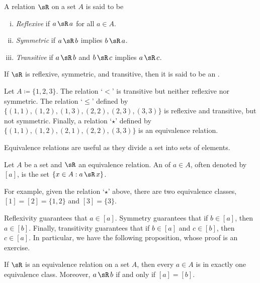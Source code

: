 \begin{defn}
\pagebreak[2]
A relation
$\sR$ on a set $A$ is said to be
\begin{enumerate}[(i)]
\item
\emph{Reflexive} if $a\, \sR \, a$ for
all $a \in A$.
\item
\emph{Symmetric} if $a\, \sR \, b$ implies
$b \, \sR \, a$.
\item
\emph{Transitive} if $a\, \sR \, b$ and
$b \, \sR \, c$ implies $a\, \sR \, c$.
\end{enumerate}
If $\sR$ is reflexive, symmetric, and transitive, then it is said to be
an \emph{}.
\end{defn}

\begin{example}
Let $A \coloneqq \{ 1,2,3 \}$.
The relation `$<$' is transitive but neither reflexive nor symmetric.  The
relation `$\leq$' defined by
$\bigl\{ (1,1), (1,2), (1,3), (2,2), (2,3), (3,3) \bigr\}$
is reflexive and transitive, but not symmetric.
Finally, a relation `$\star$' defined by
$\bigl\{ (1,1), (1,2), \allowbreak (2,1), \allowbreak (2,2), \allowbreak (3,3) \bigr\}$ is
an equivalence relation.
\end{example}

Equivalence relations are useful as they divide a set into sets of
 elements.

\begin{defn}
Let $A$ be a set and $\sR$ an equivalence relation.
An \emph{} of $a \in A$, often denoted
by $[a]$, is the set $\{ x \in A : a\, \sR \, x \}$.
\end{defn}

For example, given the relation `$\star$' above, there are two equivalence classes,
$[1] = [2] = \{ 1,2 \}$ and $[3] = \{ 3 \}$.

Reflexivity guarantees that $a \in [a]$.  Symmetry guarantees
that if $b \in [a]$, then $a \in [b]$.  Finally, transitivity guarantees that
if $b \in [a]$ and $c \in [b]$, then $c \in [a]$.
In particular, we have the following proposition, whose proof is an
exercise.

\begin{prop} \label{prop:equivclasses}
If $\sR$ is an equivalence relation on a set $A$,
then every $a \in A$ is in exactly one
equivalence class.  Moreover, $a\, \sR \, b$ if and only if $[a] = [b]$.
\end{prop}


